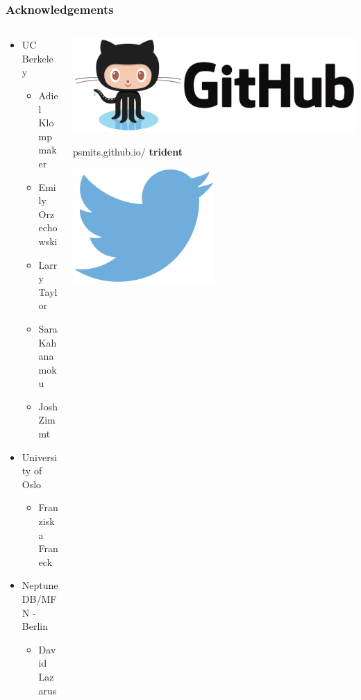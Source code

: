 \documentclass[aspectratio=169]{beamer}
\begin{document}
\begin{frame}
  \frametitle{Acknowledgements}
  \begin{columns}
    \begin{column}{0.5\textwidth}
      \begin{itemize}
        \item UC Berkeley
          \begin{itemize}
            \item Adiel Klompmaker 
            \item Emily Orzechowski
            \item Larry Taylor
            \item Sara Kahanamoku
            \item Josh Zimmt
          \end{itemize}
        \item University of Oslo
          \begin{itemize}
            \item Franziska Franeck
          \end{itemize}
        \item Neptune DB/MFN - Berlin
          \begin{itemize}
            \item David Lazarus
          \end{itemize}
      \end{itemize}
    \end{column}
    \begin{column}{0.5\textwidth}
      \begin{center}
        \includegraphics[height=0.15\textheight,width=\textwidth,keepaspectratio=true]{figure/github-logo}

        psmits.github.io/ \hspace*{0.05\textwidth} \textbf{trident}
      \end{center}
      \vspace*{0.02\textheight}
      \begin{center}
        \includegraphics[height=0.1\textheight,width=0.5\textwidth,keepaspectratio=true]{figure/twitter} 


\end{center}
\end{column}
\end{columns}
\end{frame}
\end{document}
